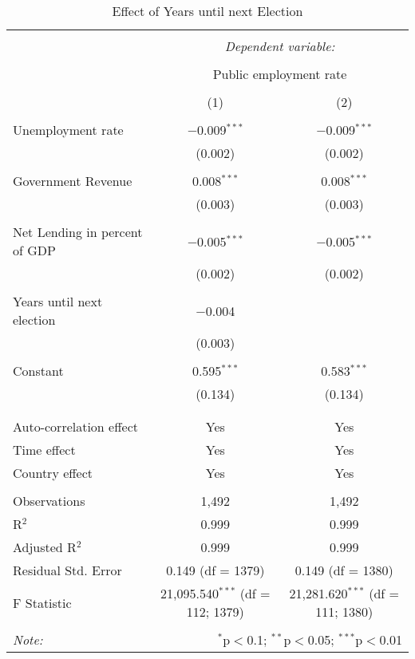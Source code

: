 
\begin{table}[!htbp] \centering 
  \caption{Effect of Years until next Election} 
  \label{} 
\begin{tabular}{@{\extracolsep{5pt}}lcc} 
\\[-1.8ex]\hline 
\hline \\[-1.8ex] 
 & \multicolumn{2}{c}{\textit{Dependent variable:}} \\ 
\cline{2-3} 
\\[-1.8ex] & \multicolumn{2}{c}{Public employment rate} \\ 
\\[-1.8ex] & (1) & (2)\\ 
\hline \\[-1.8ex] 
 Unemployment rate & $-$0.009$^{***}$ & $-$0.009$^{***}$ \\ 
  & (0.002) & (0.002) \\ 
  & & \\ 
 Government Revenue & 0.008$^{***}$ & 0.008$^{***}$ \\ 
  & (0.003) & (0.003) \\ 
  & & \\ 
 Net Lending in percent of GDP & $-$0.005$^{***}$ & $-$0.005$^{***}$ \\ 
  & (0.002) & (0.002) \\ 
  & & \\ 
 Years until next election & $-$0.004 &  \\ 
  & (0.003) &  \\ 
  & & \\ 
 Constant & 0.595$^{***}$ & 0.583$^{***}$ \\ 
  & (0.134) & (0.134) \\ 
  & & \\ 
\hline \\[-1.8ex] 
Auto-correlation effect & Yes & Yes \\ 
Time effect & Yes & Yes \\ 
Country effect & Yes & Yes \\ 
\hline \\[-1.8ex] 
Observations & 1,492 & 1,492 \\ 
R$^{2}$ & 0.999 & 0.999 \\ 
Adjusted R$^{2}$ & 0.999 & 0.999 \\ 
Residual Std. Error & 0.149 (df = 1379) & 0.149 (df = 1380) \\ 
F Statistic & 21,095.540$^{***}$ (df = 112; 1379) & 21,281.620$^{***}$ (df = 111; 1380) \\ 
\hline 
\hline \\[-1.8ex] 
\textit{Note:}  & \multicolumn{2}{r}{$^{*}$p$<$0.1; $^{**}$p$<$0.05; $^{***}$p$<$0.01} \\ 
\end{tabular} 
\end{table} 
